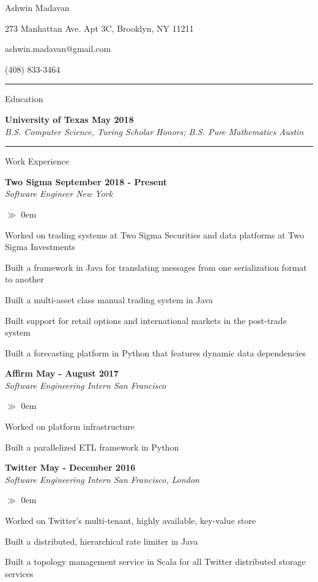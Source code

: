\documentclass{article}
\begin{document}

\centerline{\LARGE \sc Ashwin Madavan}
\centerline{273 Manhattan Ave. Apt 3C, Brooklyn, NY 11211}
\centerline{ashwin.madavan@gmail.com}
\centerline{(408) 833-3464}
\medskip\hrule\medskip

\centerline{\large \sc Education}\smallskip 
\noindent\textbf{University of Texas \hfill{May 2018}} \\
\noindent\emph{B.S. Computer Science, Turing Scholar Honors; B.S. Pure Mathematics \hfill{Austin}}\\

\hrule\medskip
\centerline{\large \sc Work Experience} \smallskip
\noindent\textbf{Two Sigma \hfill{September 2018 - Present}}\\
\noindent\emph{Software Engineer \hfill{New York}}
\begin{list}{$\gg$}{}
\itemsep0em
  \item Worked on trading systems at Two Sigma Securities and data platforms at Two Sigma Investments
  \item Built a framework in Java for translating messages from one serialization format to another
  \item Built a multi-asset class manual trading system in Java
  \item Built support for retail options and international markets in the post-trade system
  \item Built a forecasting platform in Python that features dynamic data dependencies
\end{list}

\noindent\textbf{Affirm \hfill{May - August 2017}}\\
\noindent\emph{Software Engineering Intern \hfill{San Francisco}}
\begin{list}{$\gg$}{}  
  \itemsep0em
  \item Worked on platform infrastructure
  \item Built a parallelized ETL framework in Python
\end{list}

\noindent\textbf{Twitter \hfill{May - December 2016}}\\
\noindent\emph{Software Engineering Intern \hfill{San Francisco, London}}
\begin{list}{$\gg$}{}  
  \itemsep0em
  \item Worked on Twitter's multi-tenant, highly available, key-value store
  \item Built a distributed, hierarchical rate limiter in Java
  \item Built a topology management service in Scala for all Twitter distributed storage services
\end{list}
\end{document}
